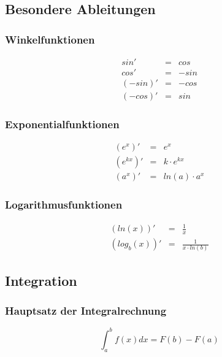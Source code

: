 \subsection{Besondere Ableitungen} 
\label{sub:besondere_ableitungen}

\subsubsection{Winkelfunktionen}
\label{ssub:winkelfunktionen}	
\begin{eqnarray}
	sin' &=& cos \\
	cos' &=& -sin \\
	(-sin)' &=& -cos \\
	(-cos)' &=& sin
\end{eqnarray}

\subsubsection{Exponentialfunktionen}
\label{ssub:exponentialfunktionen}	
\begin{eqnarray}
	(e^x)' &=& e^x \\
	(e^{kx})' &=& k \cdot e^{kx} \\
	(a^x)' &=& ln(a) \cdot a^x
\end{eqnarray}

\subsubsection{Logarithmusfunktionen}
\label{ssub:logarithmusfunktionen}	
\begin{eqnarray}
	(ln(x))' &=& \frac{1}{x} \\
	(log_b(x))' &=& \frac{1}{x \cdot ln(b)}
\end{eqnarray}	

\subsection{Integration} 
\label{sub:integration}

\subsubsection{Hauptsatz der Integralrechnung} 
\label{ssub:hauptsatz_der_integralrechnung}

\begin{equation}
	\int_a^b f(x)dx = F(b) - F(a)
\end{equation}

